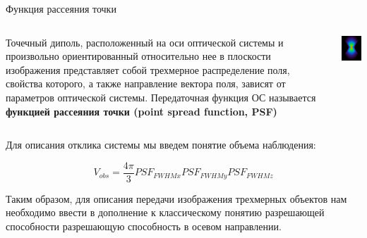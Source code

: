 \documentclass[9pt, compress, xcolor=table]{beamer}
\begin{document}
\begin{frame}{Функция рассеяния точки}

\begin{columns}[c]
\column{2.2in}

{\small Точечный диполь, расположенный на оси оптической системы и произвольно
ориентированный относительно нее в плоскости изображения представляет собой трехмерное
распределение поля, свойства которого, а также направление вектора поля, зависят от параметров
оптической системы. Передаточная функция ОС называется \textcolor{red!50!black}{\textbf{ функцией рассеяния точки (point spread function, PSF)}}}

\column{2.2in}
\begin{center}
\includegraphics[width=4cm]{fig4_24}
\end{center}
\end{columns}

Для описания отклика системы мы введем понятие объема наблюдения:

\begin{equation*}
V_{obs}= \frac{4\pi}{3}PSF_{FWHMx}PSF_{FWHMy}PSF_{FWHMz}
\end{equation*}

{\small Таким образом, для описания передачи изображения трехмерных объектов нам необходимо ввести в дополнение к классическому понятию разрешающей способности разрешающую способность в осевом направлении.}
\end{frame}
\end{document}
